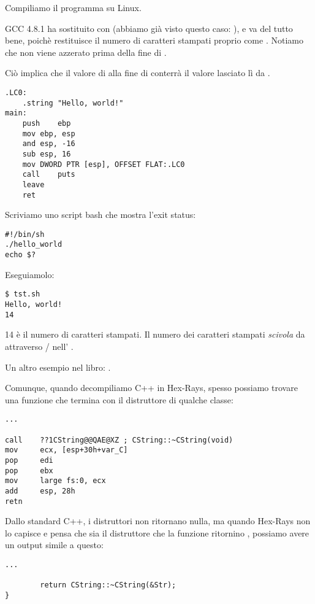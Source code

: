 Compiliamo il programma su Linux.

GCC 4.8.1 ha sostituito \printf con \puts 
(abbiamo già visto questo caso: ), e va del tutto bene, poichè \puts restituisce il numero di caratteri stampati proprio come \printf.
Notiamo che \EAX non viene azzerato prima della fine di \main.

Ciò implica che il valore di \EAX alla fine di \main conterrà il valore lasciato lì da \puts.

\begin{lstlisting}[caption=GCC 4.8.1,style=customasmx86]
.LC0:
	.string	"Hello, world!"
main:
	push	ebp
	mov	ebp, esp
	and	esp, -16
	sub	esp, 16
	mov	DWORD PTR [esp], OFFSET FLAT:.LC0
	call	puts
	leave
	ret
\end{lstlisting}


Scriviamo uno script bash che mostra l'exit status:

\begin{lstlisting}[caption=tst.sh]
#!/bin/sh
./hello_world
echo $?
\end{lstlisting}

Eseguiamolo:

\begin{lstlisting}
$ tst.sh 
Hello, world!
14
\end{lstlisting}

14 è il numero di caratteri stampati. Il numero dei caratteri stampati \textit{scivola} da \printf{} attraverso / nell' .

Un altro esempio nel libro: .

Comunque, quando decompiliamo C++ in Hex-Rays, spesso possiamo trovare una funzione che termina con il distruttore di qualche classe:

\begin{lstlisting}[style=customasmx86]
...

call    ??1CString@@QAE@XZ ; CString::~CString(void)
mov     ecx, [esp+30h+var_C]
pop     edi
pop     ebx
mov     large fs:0, ecx
add     esp, 28h
retn
\end{lstlisting}

Dallo standard C++, i distruttori non ritornano nulla, ma quando Hex-Rays non lo capisce e pensa che sia il distruttore che la funzione ritornino \Tint, possiamo avere un output simile a questo:

\begin{lstlisting}[style=customc] 
...

        return CString::~CString(&Str);
}
\end{lstlisting}

